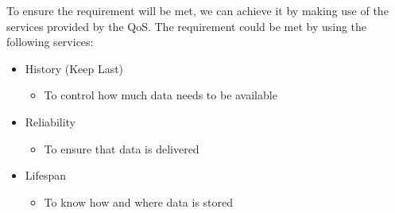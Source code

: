 To ensure the requirement will be met, we can achieve it by making use of the services provided by the QoS. The requirement could be met by using the following services:

\begin{itemize}
\item History (Keep Last)
\begin{itemize}
\item To control how much data needs to be available
\end{itemize}
\item Reliability
\begin{itemize}
\item To ensure that data is delivered
\end{itemize}
\item Lifespan
\begin{itemize}
\item To know how and where data is stored
\end{itemize}
\end{itemize}